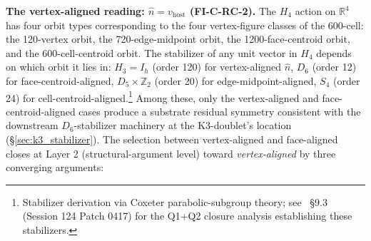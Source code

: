 \documentclass[11pt,letterpaper]{article}
\newcommand{\Dsix}{D_6}
\newcommand{\Hfour}{H_4}
\begin{document}
\textbf{The vertex-aligned reading: $\hat{n} = v_{\text{host}}$ (FI-C-RC-2).} The $\Hfour$ action on $\mathbb{R}^4$ has four orbit types corresponding to the four vertex-figure classes of the 600-cell: the 120-vertex orbit, the 720-edge-midpoint orbit, the 1200-face-centroid orbit, and the 600-cell-centroid orbit. The stabilizer of any unit vector in $\Hfour$ depends on which orbit it lies in: $H_3 = I_h$ (order 120) for vertex-aligned $\hat{n}$, $\Dsix$ (order 12) for face-centroid-aligned, $D_5 \times \mathbb{Z}_2$ (order 20) for edge-midpoint-aligned, $S_4$ (order 24) for cell-centroid-aligned.\footnote{Stabilizer derivation via Coxeter parabolic-subgroup theory; see~\cite{abshier_capotauro_chiral_mechanism_sketch} \S9.3 (Session 124 Patch 0417) for the Q1+Q2 closure analysis establishing these stabilizers.} Among these, only the vertex-aligned and face-centroid-aligned cases produce a substrate residual symmetry consistent with the downstream $\Dsix$-stabilizer machinery at the K3-doublet's location (\S\ref{sec:k3_stabilizer}). The selection between vertex-aligned and face-aligned closes at Layer 2 (structural-argument level) toward \emph{vertex-aligned} by three converging arguments:
\end{document}
